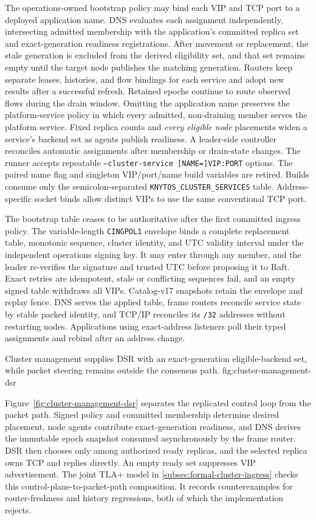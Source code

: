 The operations-owned bootstrap policy may bind each VIP and TCP port to a
deployed application name. DNS evaluates each assignment independently,
intersecting admitted membership with the application's committed replica set
and exact-generation readiness registrations. After movement or replacement,
the stale generation is excluded from the derived eligibility set, and that set
remains empty until the target node publishes the matching generation. Routers
keep separate leases, histories, and flow bindings for each service and adopt
new results after a successful refresh. Retained epochs continue to route
observed flows during the drain window. Omitting the application name preserves
the platform-service policy in which every admitted, non-draining member serves the
platform service. Fixed replica counts and \emph{every eligible node}
placements widen a service's backend set as agents publish readiness. A
leader-side controller reconciles automatic assignments after membership or
drain-state changes. The runner accepts repeatable
\texttt{--cluster-service [NAME=]VIP:PORT} options. The paired name flag and
singleton VIP/port/name build variables are retired. Builds consume only the
semicolon-separated \texttt{KNYTOS\_CLUSTER\_SERVICES} table.
Address-specific socket binds allow
distinct VIPs to use the same conventional TCP port.

The bootstrap table ceases to be authoritative after the first committed
ingress policy. The variable-length \texttt{CINGPOL1} envelope binds a complete
replacement table, monotonic sequence, cluster identity, and UTC validity
interval under the independent operations signing key. It may enter through any
member, and the leader re-verifies the signature and trusted UTC before proposing
it to Raft. Exact retries are idempotent, stale or conflicting sequences fail,
and an empty signed table withdraws all VIPs. Catalog-v17 snapshots retain the
envelope and replay fence. DNS serves the applied table, frame routers
reconcile service state by stable packed identity, and TCP/IP reconciles its
\texttt{/32} addresses without restarting nodes. Applications using
exact-address listeners poll their typed assignments and rebind after an
address change.

    {Cluster management supplies DSR with an exact-generation eligible-backend
     set, while packet steering remains outside the consensus path.}
    {fig:cluster-management-dsr}

Figure~\ref{fig:cluster-management-dsr} separates the replicated control loop
from the packet path. Signed policy and committed membership determine desired
placement, node agents contribute exact-generation readiness, and DNS derives
the immutable epoch snapshot consumed asynchronously by the frame router. DSR
then chooses only among authorized ready replicas, and the selected replica owns
TCP and replies directly. An empty ready set suppresses VIP advertisement.
The joint TLA+ model in
\autoref{subsec:formal-cluster-ingress} checks this control-plane-to-packet-path
composition. It records counterexamples for router-freshness and history
regressions, both of which the implementation rejects.

